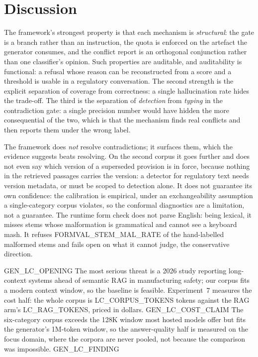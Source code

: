 \documentclass[conference]{IEEEtran}
\begin{document}
\section{Discussion}

The framework's strongest property is that each mechanism is \emph{structural}:
the gate is a branch rather than an instruction, the quota is enforced on the
artefact the generator consumes, and the conflict report is an orthogonal
conjunction rather than one classifier's opinion. Such properties are auditable,
and auditability is functional: a refusal whose reason can be reconstructed
from a score and a threshold is usable in a regulatory conversation. The second
strength is the explicit separation of coverage from correctness: a single
hallucination rate hides the trade-off. The third is the separation of
\emph{detection} from \emph{typing} in the contradiction gate: a single
precision number would have hidden the more consequential of the two, which
is that the mechanism finds real conflicts and then reports them under the
wrong label.

The framework does \emph{not} resolve contradictions; it surfaces them, which
the evidence suggests beats resolving. On the second corpus it goes further
and does not even say which version of a superseded provision is in force,
because nothing in the retrieved passages carries the version: a detector for
regulatory text needs version metadata, or must be scoped to detection alone.
It does not guarantee its own
confidence: the calibration is empirical, under an exchangeability assumption a
single-category corpus violates, so the conformal diagnostics are a limitation,
not a guarantee. The runtime form check does not parse English: being lexical,
it misses stems whose malformation is grammatical and cannot see a keyboard
mash. It refuses {{FORMVAL_STEM_MAL_RATE}} of the hand-labelled malformed stems
and fails open on what it cannot judge, the conservative direction.

{{GEN_LC_OPENING}} The most serious threat is a 2026 study reporting
long-context systems ahead of semantic RAG in manufacturing safety; our corpus
fits a modern context window, so the baseline is feasible. Experiment~7
measures the cost half: the whole corpus is {{LC_CORPUS_TOKENS}} tokens against
the RAG arm's {{LC_RAG_TOKENS}}, priced in dollars. {{GEN_LC_COST_CLAIM}}
The six-category corpus exceeds the 128K window most hosted models offer but
fits the generator's 1M-token window, so the answer-quality half is measured on
the focus domain, where the corpora are never pooled, not because the
comparison was impossible. {{GEN_LC_FINDING}}
\end{document}
